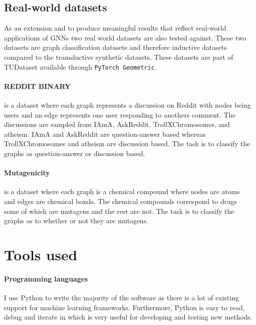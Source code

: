 \subsection{Real-world datasets}
\label{sec:RWD}


As an extension and to produce meaningful results that reflect real-world applications of GNNs two real world datasets are also tested against.
These two datasets are graph classification datasets and therefore inductive datasets compared to the transductive synthetic datasets.
These datasets are part of TUDataset \cite{Morris+2020} available through \texttt{PyTorch Geometric}.

\paragraph{REDDIT BINARY}
is a dataset where each graph represents a discussion on Reddit with nodes being users and an edge represents one user responding to anothers comment.
The discussions are sampled from IAmA, AskReddit, TrollXChromosomes, and atheism.
IAmA and AskReddit are question-answer based whereas TrollXChromosomes and atheism are discussion based.
The task is to classify the graphs as question-answer or discussion based.

\paragraph{Mutagenicity}
is a dataset where each graph is a chemical compound where nodes are atoms and edges are chemical bonds.
The chemical compounds correspond to drugs some of which are mutagens and the rest are not.
The task is to classify the graphs as to whether or not they are mutagens.

\section{Tools used}


\paragraph{Programming languages}
I use Python to write the majority of the software as there is a lot of existing support for machine learning frameworks.
Furthermore, Python is easy to read, debug and iterate in which is very useful for developing and testing new methods.

